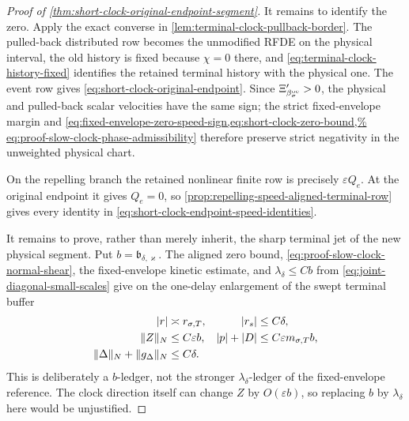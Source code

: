 \begin{proof}[Proof of
\cref{thm:short-clock-original-endpoint-segment}]
It remains to identify the zero.  Apply the exact converse in
\cref{lem:terminal-clock-pullback-border}.  The pulled-back distributed
row becomes the unmodified RFDE on the physical interval, the old history
is fixed because \(\chi=0\) there, and
\cref{eq:terminal-clock-history-fixed} identifies the retained terminal
history with the physical one.  The event row gives
\cref{eq:short-clock-original-endpoint}.  Since
\(\Xi_{\beta_\sigma^{\rm oe}}'>0\), the physical and pulled-back scalar
velocities have the same sign; the strict fixed-envelope margin and
\cref{eq:fixed-envelope-zero-speed-sign,eq:short-clock-zero-bound,%
eq:proof-slow-clock-phase-admissibility} therefore preserve strict
negativity in the unweighted physical chart.

On the repelling branch the retained nonlinear finite row is precisely
\(\varepsilon Q_e\).  At the original endpoint it gives \(Q_e=0\), so
\cref{prop:repelling-speed-aligned-terminal-row} gives every identity in
\cref{eq:short-clock-endpoint-speed-identities}.

It remains to prove, rather than merely inherit, the sharp terminal jet of
the new physical segment.  Put
\(b=\mathfrak b_{\delta,\varkappa}\).  The aligned zero bound,
\cref{eq:proof-slow-clock-normal-shear}, the fixed-envelope kinetic
estimate, and \(\lambda_\delta\le Cb\) from
\cref{eq:joint-diagonal-small-scales} give on the one-delay enlargement of
the swept terminal buffer
\begin{align}
 |r|&\asymp r_{\sigma,T},& |r_s|&\le C\delta,\notag\\
 \|Z\|_N&\le C\varepsilon b,&
 |p|+|D|&\le C\varepsilon m_{\sigma,T}b,\notag\\
 \|\Delta\|_N+\|g_\Delta\|_N&\le C\delta.      \label{eq:proof-clock-terminal-base-ledger}
\end{align}
This is deliberately a \(b\)-ledger, not the stronger
\(\lambda_\delta\)-ledger of the fixed-envelope reference.  The clock
direction itself can change \(Z\) by \(O(\varepsilon b)\), so replacing
\(b\) by \(\lambda_\delta\) here would be unjustified.


\end{proof}
